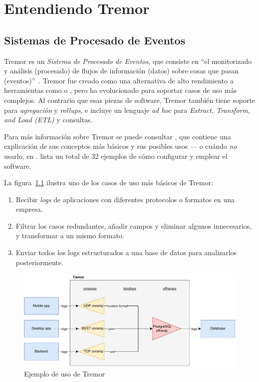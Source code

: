 
\chapter{Entendiendo Tremor}\label{ch:tremor}

\section{Sistemas de Procesado de Eventos}

Tremor es un \emph{Sistema de Procesado de Eventos}, que consiste en ``el
monitorizado y análisis (procesado) de flujos de información (datos) sobre cosas
que pasan (eventos)''~\cite{luckham2011event}. Tremor fue creado como una
alternativa de alto rendimiento a herramientas como \textcite{logstash} o
\textcite{telegraf}, pero ha evolucionado para soportar casos de uso más
complejos. Al contrario que esas piezas de software, Tremor también tiene
soporte para \emph{agregación} y \emph{rollups}, e incluye un lenguaje \emph{ad
hoc} para \emph{Extract, Transform, and Load (ETL)} y consultas.

Para más información sobre Tremor se puede consultar \textcite{tremorintro}, que
contiene una explicación de sus conceptos más básicos y sus posibles usos --- o
cuándo \emph{no} usarlo, en \textcite{tremorconstraints}.
\textcite{tremorrecipes} lista un total de 32 ejemplos de cómo configurar y
emplear el software.

La figura~\ref{fig:tremor_example} ilustra uno de los casos de uso más básicos
de Tremor:

\begin{enumerate}
    \item Recibir \emph{logs} de aplicaciones con diferentes protocolos o
        formatos en una empresa.
    \item Filtrar los casos redundantes, añadir campos y eliminar algunos
        innecesarios, y transformar a un mismo formato.
    \item Enviar todos los logs estructurados a una base de datos para
        analizarlos posteriormente.
\end{enumerate}

\begin{figure}
    \centering
    \includegraphics[width=\textwidth]{./Imagenes/example.pdf}
    \caption{Ejemplo de uso de Tremor}%
    \label{fig:tremor_example}
\end{figure}

